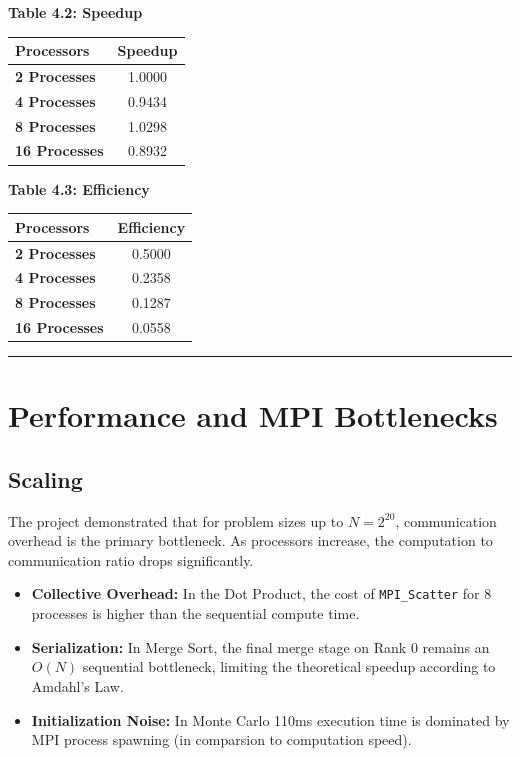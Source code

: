 \documentclass[11pt]{article}
\begin{document}
\begin{center}
\textbf{Table 4.2: Speedup} \\
\begin{tabular}{@{}lc@{}}
\toprule
Processors & Speedup \\
\midrule
\textbf{2 Processes} & 1.0000 \\
\textbf{4 Processes} & 0.9434 \\
\textbf{8 Processes} & 1.0298 \\
\textbf{16 Processes} & 0.8932 \\
\bottomrule
\end{tabular}
\end{center}

\begin{center}
\textbf{Table 4.3: Efficiency} \\
\begin{tabular}{@{}lc@{}}
\toprule
Processors & Efficiency \\
\midrule
\textbf{2 Processes} & 0.5000 \\
\textbf{4 Processes} & 0.2358 \\
\textbf{8 Processes} & 0.1287 \\
\textbf{16 Processes} & 0.0558 \\
\bottomrule
\end{tabular}
\end{center}

\noindent\rule{\textwidth}{0.4pt}

\section*{Performance and MPI Bottlenecks}

\subsection*{Scaling}
The project demonstrated that for problem sizes up to $N = 2^{20}$, communication overhead is the primary bottleneck. As processors increase, the computation to communication ratio drops significantly.
\begin{itemize}
    \item \textbf{Collective Overhead:} In the Dot Product, the cost of \texttt{MPI\_Scatter} for 8 processes is higher than the sequential compute time.
    \item \textbf{Serialization:} In Merge Sort, the final merge stage on Rank 0 remains an $O(N)$ sequential bottleneck, limiting the theoretical speedup according to Amdahl's Law.
    \item \textbf{Initialization Noise:} In Monte Carlo 110ms execution time is dominated by MPI process spawning (in comparsion to computation speed).
\end{itemize}
\end{document}
